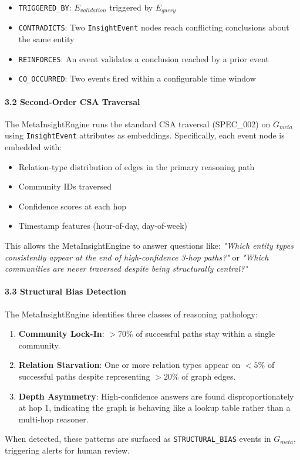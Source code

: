 \documentclass[10pt,journal,compsoc]{IEEEtran}
\begin{document}
\begin{itemize}
\item \texttt{TRIGGERED\_BY}: $E_{validation}$ triggered by $E_{query}$
\item \texttt{CONTRADICTS}: Two \texttt{InsightEvent} nodes reach conflicting conclusions about the same entity
\item \texttt{REINFORCES}: An event validates a conclusion reached by a prior event
\item \texttt{CO\_OCCURRED}: Two events fired within a confi\-gurable time window

\end{itemize}
\paragraph{3.2 Second-Order CSA Traversal}
The MetaInsightEngine runs the standard CSA traversal (SPEC\_002) on $G_{meta}$ using \texttt{InsightEvent} attributes as embeddings. Specif\-ically, each event node is embedded with:
\begin{itemize}
\item Relation-type distr\-ibution of edges in the primary reasoning path
\item Community IDs traversed
\item Confidence scores at each hop
\item Timestamp features (hour-of-day, day-of-week)

\end{itemize}
This allows the MetaInsightEngine to answer questions like: \textit{"Which entity types consi\-stently appear at the end of high-confidence 3-hop paths?"} or \textit{"Which communities are never traversed despite being struc\-turally central?"}

\paragraph{3.3 Structural Bias Detection}
The MetaInsightEngine identifies three classes of reasoning pathology:
\begin{enumerate}
\item \textbf{Community Lock-In}: $> 70\%$ of successful paths stay within a single community.
\item \textbf{Relation Starvation}: One or more relation types appear on $< 5\%$ of successful paths despite repre\-senting $> 20\%$ of graph edges.
\item \textbf{Depth Asymmetry}: High-confidence answers are found dispr\-oportionately at hop 1, indicating the graph is behaving like a lookup table rather than a multi-hop reasoner.

\end{enumerate}
When detected, these patterns are surfaced as \texttt{STRUCTURAL\_BIAS} events in $G_{meta}$, triggering alerts for human review.
\end{document}
